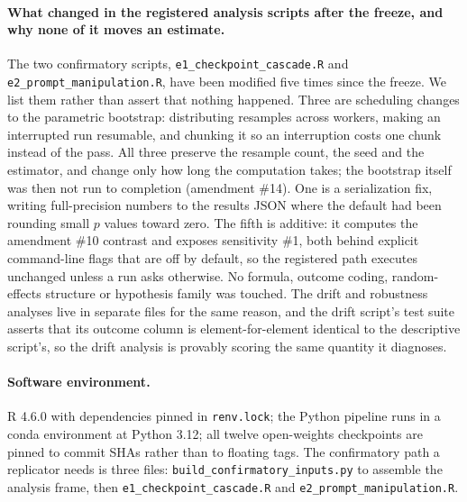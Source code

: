 \paragraph{What changed in the registered analysis scripts after the freeze, and why none of it moves an estimate.}
The two confirmatory scripts, \texttt{e1\_checkpoint\_cascade.R} and
\texttt{e2\_prompt\_manipulation.R}, have been modified five times since the
freeze. We list them rather than assert that nothing happened. Three are
scheduling changes to the parametric bootstrap: distributing resamples across
workers, making an interrupted run resumable, and chunking it so an interruption
costs one chunk instead of the pass. All three preserve the resample count, the
seed and the estimator, and change only how long the computation takes; the
bootstrap itself was then not run to completion (amendment \#14). One is a
serialization fix, writing full-precision numbers to the results JSON where the
default had been rounding small $p$ values toward zero. The fifth is additive:
it computes the amendment \#10 contrast and exposes sensitivity \#1, both behind
explicit command-line flags that are off by default, so the registered path
executes unchanged unless a run asks otherwise. No formula, outcome coding,
random-effects structure or hypothesis family was touched. The drift and
robustness analyses live in separate files for the same reason, and the drift
script's test suite asserts that its outcome column is element-for-element
identical to the descriptive script's, so the drift analysis is provably scoring
the same quantity it diagnoses.

\paragraph{Software environment.}
R 4.6.0 with dependencies pinned in \texttt{renv.lock}; the Python pipeline runs
in a conda environment at Python 3.12; all twelve open-weights checkpoints are
pinned to commit SHAs rather than to floating tags. The confirmatory path a
replicator needs is three files:
\texttt{build\_confirmatory\_inputs.py} to assemble the analysis frame, then
\texttt{e1\_checkpoint\_cascade.R} and \texttt{e2\_prompt\_manipulation.R}.


